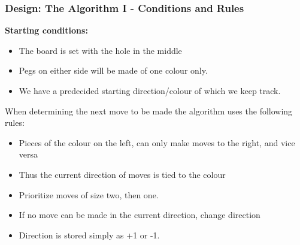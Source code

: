 \documentclass{beamer}
\begin{document}
	\begin{frame}
		\frametitle{Design: The Algorithm I - Conditions and Rules}
		\textbf{Starting conditions:} 
		\begin{itemize}
		\item The board is set with the hole in the middle
		\item Pegs on either side will be made of one colour only. 
		\item We have a predecided starting direction/colour of which we keep track. 
		\end{itemize}
		
		When determining the next move to be made the algorithm uses the following rules:
		\begin{itemize}
			\item Pieces of the colour on the left, can only make moves to the right, and vice versa
			\item Thus the current direction of moves is tied to the colour
			\item Prioritize moves of size two, then one. 
			\item If no move can be made in the current direction, change direction
			\item Direction is stored simply as +1 or -1. 
		\end{itemize}
		
	\end{frame}
	
\end{document}
